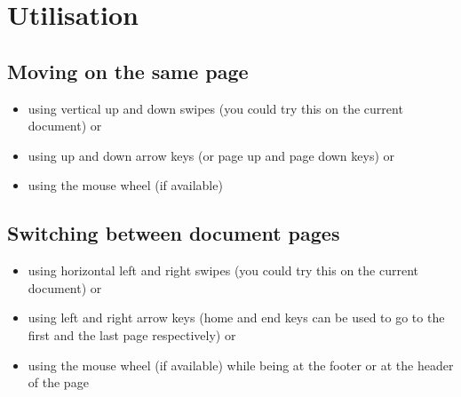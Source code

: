 \documentclass[journal,12pt]{IEEEtran}
\begin{document}
\newpage

\section{Utilisation}

\subsection{Moving on the same page}
\begin{itemize}
 \item using vertical up and down swipes (you could try this on the current document) or
 \item using up and down arrow keys (or page up and page down keys) or
 \item using the mouse wheel (if available)
\end{itemize}

\subsection{Switching between document pages}
\begin{itemize}
 \item using horizontal left and right swipes (you could try this on the current document) or
 \item using left and right arrow keys (home and end keys can be used to go to the first and the last page respectively) or
 \item using the mouse wheel (if available) while being at the footer or at the header of the page
\end{itemize}
\end{document}
